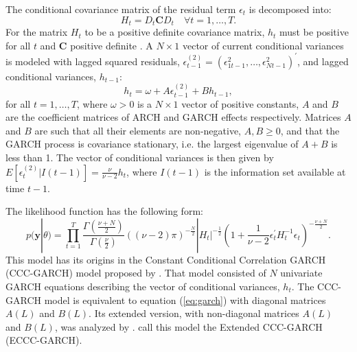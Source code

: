 \documentclass[final,3p,authoryear]{elsarticle}
\begin{document}
The conditional covariance matrix of the residual term $\epsilon_t$ is decomposed into:
\begin{equation}\label{eq:covariance}
H_t = D_t \mathbf{C} D_t \quad \forall t=1,\dots,T. 
\end{equation} 
For the matrix $H_t$ to be a positive definite covariance matrix, $h_t$ must be positive for all $t$ and $\mathbf{C}$ positive definite \citep[see][]{Bollerslev1990}. A $N\times 1$ vector of current conditional variances is modeled with lagged squared residuals, $\epsilon_{t-1}^{(2)} = (\epsilon_{1t-1}^{2}, \dots, \epsilon_{Nt-1}^{2})^{\prime}$, and lagged conditional variances, $h_{t-1}$:
\begin{equation}\label{eq:garch}
h_t = \omega + A\epsilon_{t-1}^{(2)} + Bh_{t-1},
\end{equation} 
for all $t=1,\dots,T$, where $\omega >0$ is a $N\times 1$ vector of positive constants, $A$ and $B$ are the coefficient matrices of ARCH and GARCH effects respectively. Matrices $A$ and $B$ are such that all their elements are non-negative, $A,B\geq0$, and that the GARCH process is covariance stationary, i.e. the largest eigenvalue of $A+B$ is less than 1. The vector of conditional variances is then given by $E[\epsilon_{t}^{(2)}|I(t-1)] = \frac{\nu}{\nu-2}h_{t}$, where $I(t-1)$ is the information set available at time $t-1$.
 
The likelihood function has the following form:
\begin{equation}\label{eq:likelihood}
p(\mathbf{y}|\theta) = \prod_{t=1}^{T} \frac{\Gamma\left(\frac{\nu+N}{2} \right)}{\Gamma\left(\frac{\nu}{2} \right)}\left( (\nu -2) \pi\right)^{-\frac{N}{2}} |H_t|^{-\frac{1}{2}}\left( 1 + \frac{1}{\nu -2} \epsilon_{t}^{\prime}H_{t}^{-1}\epsilon_{t} \right)^{-\frac{\nu+N}{2}}.
\end{equation} 
This model has its origins in the Constant Conditional Correlation GARCH (CCC-GARCH) model proposed by \citet{Bollerslev1990}. That model consisted of $N$ univariate GARCH equations describing the vector of conditional variances, $h_t$. The CCC-GARCH model is equivalent to equation (\ref{eq:garch}) with diagonal matrices $A(L)$ and $B(L)$. Its extended version, with non-diagonal matrices $A(L)$ and $B(L)$, was analyzed by \citet{Jeantheau1998}. \cite{He2004} call this model the Extended CCC-GARCH (ECCC-GARCH). 
 
\end{document}
